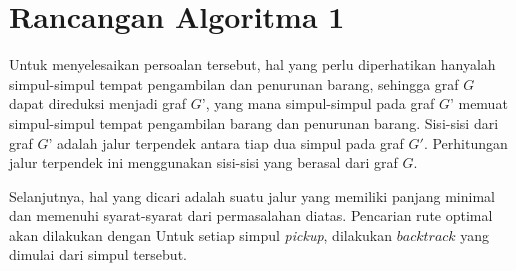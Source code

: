 \section{Rancangan Algoritma 1}

Untuk menyelesaikan persoalan tersebut, hal yang perlu diperhatikan hanyalah simpul-simpul tempat pengambilan dan penurunan barang, sehingga graf $G$ 
dapat direduksi menjadi graf $G’$, yang mana simpul-simpul pada graf $G’$ memuat simpul-simpul tempat pengambilan barang dan penurunan barang.
Sisi-sisi dari graf $G’$ adalah jalur terpendek antara tiap dua simpul pada graf $G'$. 
Perhitungan jalur terpendek ini menggunakan sisi-sisi yang berasal dari graf $G$.

Selanjutnya, hal yang dicari adalah suatu jalur yang memiliki panjang minimal dan memenuhi syarat-syarat dari permasalahan diatas.
Pencarian rute optimal akan dilakukan dengan Untuk setiap simpul \textit{pickup}, dilakukan $backtrack$ yang dimulai dari simpul tersebut.
